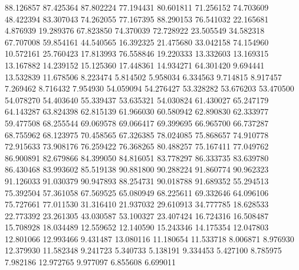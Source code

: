 88.126857
87.425364
87.802224
77.194431
80.601811
71.256152
74.703609
48.422394
83.307043
74.262055
77.167395
88.290153
76.541032
22.165681
4.876939
19.289376
67.823850
74.370039
72.728922
23.505549
34.582318
67.707008
59.854161
44.540565
16.392325
21.475680
33.042158
74.154960
10.572161
25.760423
17.813993
76.558846
19.220333
13.332603
13.169315
13.167882
14.239152
15.125360
17.448361
14.934271
64.301420
9.694441
13.532839
11.678506
8.223474
5.814502
5.958034
6.334563
9.714815
8.917457
7.269462
8.716432
7.954930
54.059094
54.276427
53.328282
53.676203
53.470500
54.078270
54.403640
55.339437
53.635321
54.030824
61.430027
65.247179
64.143287
63.824398
62.815139
61.966030
60.580942
62.890830
62.333977
59.477508
68.255544
69.069578
69.066417
69.399695
66.965700
66.737287
68.755962
68.123975
70.458565
67.326385
78.024085
75.868657
74.910778
72.915633
73.908176
76.259422
76.368265
80.488257
75.167411
77.049762
86.900891
82.679866
84.399050
84.816051
83.778297
86.333735
83.639780
86.430468
83.993602
85.519138
90.881800
90.288224
91.860774
90.962323
91.126033
91.030379
90.947893
88.254731
90.018788
91.689352
55.294513
75.392504
57.361058
67.569525
65.080949
68.225611
69.332646
64.096106
75.727661
77.011530
31.316410
21.937032
29.610913
34.777785
18.628533
22.773392
23.261305
43.030587
53.100327
23.407424
16.724316
16.508487
15.708928
18.034489
12.559652
12.140590
15.243346
14.175354
12.047803
12.801066
12.993466
9.431487
13.080116
11.180654
11.533718
8.006871
8.976930
12.379930
11.582348
9.241723
5.340733
5.138191
9.334453
5.427100
8.785975
7.982186
12.972765
9.977097
6.855608
6.699011
